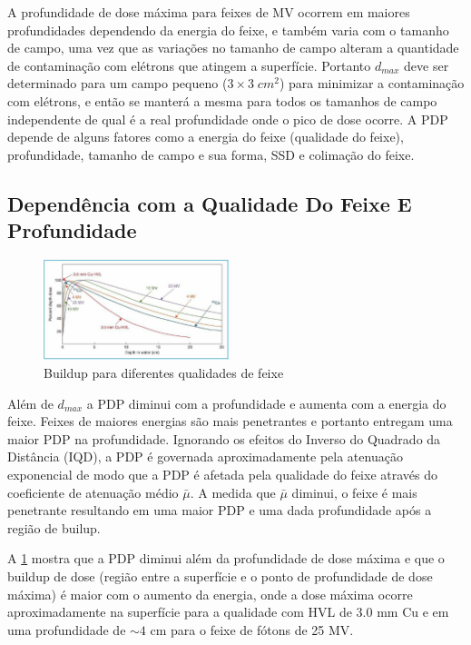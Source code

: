 \documentclass[11pt,a4paper]{article}
\begin{document}
	
	A profundidade de dose máxima para feixes de MV ocorrem em maiores profundidades dependendo da energia do feixe, e também varia com o tamanho de campo, uma vez que as variações no tamanho de campo alteram a quantidade de contaminação com elétrons que atingem a superfície. Portanto $d_{max}$ deve ser determinado para um campo pequeno ($3 \times 3 \; cm^2$) para minimizar a contaminação com elétrons, e então se manterá a mesma para todos os tamanhos de campo independente de qual é a real profundidade onde o pico de dose ocorre. A PDP depende de alguns fatores como a energia do feixe (qualidade do feixe), profundidade, tamanho de campo e sua forma, SSD e colimação do feixe. 

	\subsection{Dependência com a Qualidade Do Feixe E Profundidade}

		\begin{figure}
			\centering
			\includegraphics[width=0.48\textwidth]{Imagens/buildupDiferentesFeixes.JPG}
			\caption{Buildup para diferentes qualidades de feixe}
			\label{fig:buildupDiferentesFeixes}
		\end{figure}

	Além de $d_{max}$ a PDP diminui com a profundidade e aumenta com a energia do feixe. Feixes de maiores energias são mais penetrantes e portanto entregam uma maior PDP na profundidade. Ignorando os efeitos do Inverso do Quadrado da Distância (IQD), a PDP é governada aproximadamente pela atenuação exponencial de modo que a PDP é afetada pela qualidade do feixe através do coeficiente de atenuação médio $\bar{\mu}$.  A medida que $\bar{\mu}$ diminui, o feixe é mais penetrante resultando em uma maior PDP e uma dada profundidade após a região de builup. 

	A \ref{fig:buildupDiferentesFeixes} mostra que a PDP diminui além da profundidade de dose máxima e que o buildup de dose (região entre a superfície e o ponto de profundidade de dose máxima) é maior com o aumento da energia, onde a dose máxima ocorre aproximadamente na superfície para a qualidade com HVL de 3.0 mm Cu e em uma profundidade de $\sim 4$ cm para o feixe de fótons de 25 MV.
\end{document}
